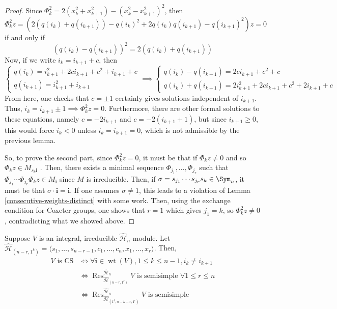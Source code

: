 \documentclass[11pt,leqno,oneside]{amsbook}
\newcommand{\Res}{\operatorname{Res}}
\renewcommand{\H}{\mathcal{H}}
\DeclareMathOperator{\wt}{wt}
\renewcommand{\vec}[1]{\mathbf{#1}}
\numberwithin{thm}{section}
\begin{document}
\begin{proof}
  Since \(\Phi_k^2 = 2(x_k^2+x_{k+1}^2) - (x_k^2-x_{k+1}^2)^2\), then \[
    \Phi_k^2 z = (2(q(i_k)+q(i_{k+1})) - q(i_k)^2 + 2q(i_k)q(i_{k+1}) -
    q(i_{k+1})^2)z = 0
  \]
  if and only if \[
    (q(i_k)-q(i_{k+1}))^2 = 2(q(i_k)+q(i_{k+1}))
  \]
  Now, if we write \(i_k = i_{k+1}+c\), then \[
    \begin{cases}
      q(i_k) = i_{k+1}^2+2c i_{k+1}+c^2 + i_{k+1}+c\\
      q(i_{k+1}) = i_{k+1}^2+i_{k+1}
    \end{cases}
    \implies
    \begin{cases}
      q(i_k)-q(i_{k+1}) = 2 c i_{k+1} + c^2 + c \\
      q(i_k)+q(i_{k+1}) = 2i_{k+1}^2+2c i_{k+1}+c^2 + 2i_{k+1}+c
    \end{cases}
  \]
  From here, one checks that \(c = \pm 1\) certainly gives 
  solutions independent of \(i_{k+1}\). Thus, \(i_k = i_{k+1} \pm 1
  \implies \Phi_k^2 z = 0\). Furthermore, there are other formal
  solutions 
  to these equations, namely \(c = -2 i_{k+1}\) and
  \(c=-2(i_{k+1}+1)\), but since \(i_{k+1} \geq 0\), this would
  force \(i_k < 0\) unless \(i_k = i_{k+1} = 0\), which is not
  admissible by the previous lemma.

  So, to prove the second part, since \(\Phi_k^2 z = 0\), it must be
  that if \(\Phi_k z \neq 0\) and so \(\Phi_k z \in M_{s_k \vec{i}}\)
  . Then, there exists a minimal sequence \(\Phi_{j_1}, \ldots,
  \Phi_{j_r}\) such that \(\Phi_{j_1} \cdots \Phi_{j_r} \Phi_k z \in
  M_{\vec{i}}\) since \(M\) is irreducible. Then, if \(\sigma = s_{j_1} \cdots s_{j_r} s_k \in \Sym_n\),
  it must be that \(\sigma \cdot \vec{i} = \vec{i}\). If one assumes
  \(\sigma \neq 1\), this leads to a violation of Lemma
  \ref{consecutive-weights-distinct} with 
  some work. Then, using the exchange condition for Coxeter groups,
  one shows that \(r=1\) which gives \(j_1 = k\), so \(\Phi_k^2 z \neq
  0\), contradicting what we showed above.
\end{proof}
\begin{rmk}
  Suppose \(V\) is an integral, irreducible
  \(\hat{\H}_n\)-module. Let \(\hat{\H}_{(n-r,1^k)} = \langle s_1,
  \ldots, s_{n-r-1},c_1,\ldots,c_n,x_1,\ldots,x_r \rangle\). Then,
  \begin{align*}
    V \text{ is CS}
    & \iff \forall \vec{i} \in \wt(V), 1 \leq k \leq n-1, i_k \neq
      i_{k+1}\\
    & \iff \Res^{\hat{\H}_n}_{\hat{\H}_{(n-r,1^r)}} V \text{ is
      semisimple }\forall 1 \leq r \leq n \\
    & \iff \Res^{\hat{\H}_n}_{\hat{\H}_{(1^k,n-k-r,1^r)}} V \text{ is
      semisimple}
  \end{align*}
  \todo{The second \(\hat{\H}_{(1^k,n-k-r,1^r)}\) is not defined.}
\end{rmk}
\end{document}
